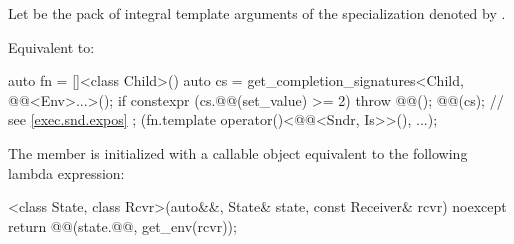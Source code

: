 \begin{itemdescr}
\pnum
Let  be the pack of integral template arguments of
the  specialization denoted by
.

\pnum
\effects
Equivalent to:
\begin{codeblock}
auto fn = []<class Child>() {
  auto cs = get_completion_signatures<Child, @@<Env>...>();
  if constexpr (cs.@@(set_value) >= 2)
    throw @@();
  @@(cs); // see \ref{exec.snd.expos}
};
(fn.template operator()<@@<Sndr, Is>>(), ...);
\end{codeblock}
\end{itemdescr}

\pnum
The member 
is initialized with a callable object
equivalent to the following lambda expression:
\begin{codeblock}
[]<class State, class Rcvr>(auto&&, State& state, const Receiver& rcvr) noexcept {
  return @@(state.@@, get_env(rcvr));
}
\end{codeblock}

